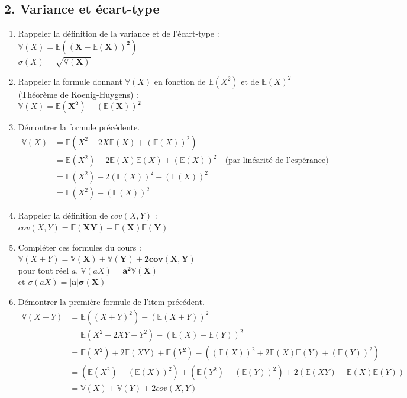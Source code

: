 \documentclass[11pt,a4paper]{article}
\begin{document}
\subsection*{2. Variance et écart-type}
\begin{enumerate}
    \item[(a)] Rappeler la définition de la variance et de l'écart-type : \\
    $\mathbb{V}(X) = \mathbf{\mathbb{E}\left((X - \mathbb{E}(X))^2\right)}$ \\
    $\sigma(X) = \mathbf{\sqrt{\mathbb{V}(X)}}$
    
    \item[(b)] Rappeler la formule donnant $\mathbb{V}(X)$ en fonction de $\mathbb{E}(X^2)$ et de $\mathbb{E}(X)^2$ (Théorème de Koenig-Huygens) : \\
    $\mathbb{V}(X) = \mathbf{\mathbb{E}(X^2) - (\mathbb{E}(X))^2}$
    
    \item[(c)] Démontrer la formule précédente.
    \begin{align*}
        \mathbb{V}(X) &= \mathbb{E}\left(X^2 - 2X\mathbb{E}(X) + (\mathbb{E}(X))^2\right) \\
        &= \mathbb{E}(X^2) - 2\mathbb{E}(X)\mathbb{E}(X) + (\mathbb{E}(X))^2 \quad \text{(par linéarité de l'espérance)} \\
        &= \mathbb{E}(X^2) - 2(\mathbb{E}(X))^2 + (\mathbb{E}(X))^2 \\
        &= \mathbb{E}(X^2) - (\mathbb{E}(X))^2
    \end{align*}
    
    \item[(d)] Rappeler la définition de $cov(X,Y)$ : \\
    $cov(X,Y) = \mathbf{\mathbb{E}(XY) - \mathbb{E}(X)\mathbb{E}(Y)}$
    
    \item[(e)] Compléter ces formules du cours : \\
    $\mathbb{V}(X+Y) = \mathbf{\mathbb{V}(X) + \mathbb{V}(Y) + 2cov(X,Y)}$ \\
    pour tout réel $a$, $\mathbb{V}(aX) = \mathbf{a^2\mathbb{V}(X)}$ \\
    et $\sigma(aX) = \mathbf{|a|\sigma(X)}$
    
    \item[(f)] Démontrer la première formule de l'item précédent.
    \begin{align*}
        \mathbb{V}(X+Y) &= \mathbb{E}\left((X+Y)^2\right) - (\mathbb{E}(X+Y))^2 \\
        &= \mathbb{E}(X^2 + 2XY + Y^2) - (\mathbb{E}(X) + \mathbb{E}(Y))^2 \\
        &= \mathbb{E}(X^2) + 2\mathbb{E}(XY) + \mathbb{E}(Y^2) - \left((\mathbb{E}(X))^2 + 2\mathbb{E}(X)\mathbb{E}(Y) + (\mathbb{E}(Y))^2\right) \\
        &= \left(\mathbb{E}(X^2) - (\mathbb{E}(X))^2\right) + \left(\mathbb{E}(Y^2) - (\mathbb{E}(Y))^2\right) + 2\left(\mathbb{E}(XY) - \mathbb{E}(X)\mathbb{E}(Y)\right) \\
        &= \mathbb{V}(X) + \mathbb{V}(Y) + 2cov(X,Y)
    \end{align*}
\end{enumerate}
\end{document}
